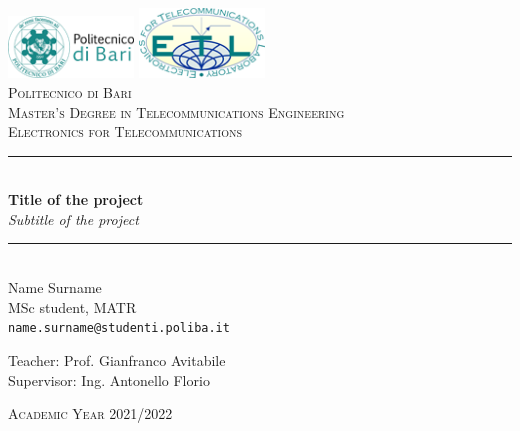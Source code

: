 \documentclass[11pt,a4paper]{article}
\newcommand{\HRule}{\rule{\linewidth}{0.5mm}}
\begin{document}
\begin{titlepage}
\begin{center}

\includegraphics[width=0.25\textwidth]{misc/poliba_logo.png}
\hfill
\includegraphics[width=0.25\textwidth]{misc/etlc_logo.png}~\\[2cm]
\textsc{\large Politecnico di Bari}\\[0.4cm]
\textsc{\large Master's Degree in Telecommunications Engineering}\\[0.4cm]
\textsc{\large Electronics for Telecommunications}\\[0.4cm]

\HRule \\[0.4cm]
{ \LARGE 
  \textbf{Title of the project}\\[0.4cm]
  \emph{Subtitle of the project}\\[0.4cm]
}
\HRule \\[1.5cm]

{ \large
  Name Surname \\[0.1cm]
  MSc student, MATR\\[0.1cm]
  \texttt{name.surname@studenti.poliba.it}
}\\[5cm]
\end{center}
{ \large
  Teacher: Prof. Gianfranco Avitabile \\[0.1cm]
  Supervisor: Ing. Antonello Florio\\[0.1cm]
}

\vfill

\begin{center}
\textsc{\large Academic Year 2021/2022}\\[0.4cm]
 
\end{center}
\end{titlepage}


\begin{abstract}
\lipsum[1-2]
\end{abstract}
\end{document}
